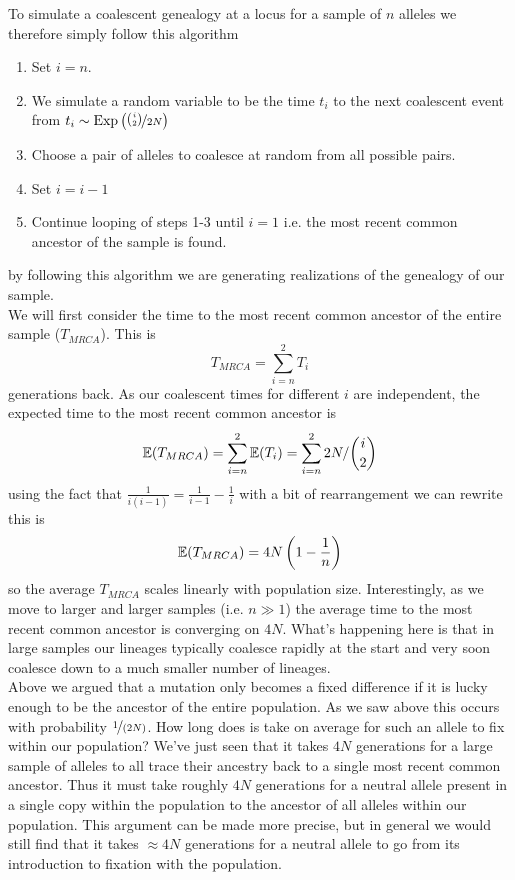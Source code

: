To simulate a coalescent genealogy at a locus for a sample of $n$ alleles we therefore simply follow this
algorithm
\begin{enumerate}
\item Set $i=n$.
\item We simulate a random variable to be the time $t_i$ to the next coalescent event from $t_i \sim
  \text{Exp}\left(\nicefrac{{i \choose
 2}}{2N} \right)$
\item Choose a pair of alleles to coalesce at random from all possible
 pairs.
\item Set $i=i-1$
\item Continue looping of steps 1-3 until $i=1$ i.e. the most recent
 common ancestor of the sample is found.
\end{enumerate}
by following this algorithm we are generating realizations of the
genealogy of our sample. \\

We will first consider the time to the most recent common ancestor of
the entire sample ($T_{MRCA}$). This is
\begin{equation}
T_{MRCA} = \sum_{i=n}^2 T_i
\end{equation}
generations back. As our coalescent times for different $i$ are independent, the expected time to the most recent common ancestor
is
\begin{equation}
\mathbb{E}(T_{MRCA}) = \sum_{i=n}^2 \mathbb{E}(T_i) = \sum_{i=n}^2  2N/{i \choose
 2}
\end{equation}
using the fact that $\frac{1}{i(i-1)}=\frac{1}{i-1} - \frac{1}{i}$ with a bit of
rearrangement we can rewrite this is
\begin{equation}
\mathbb{E}(T_{MRCA}) = 4N\left(1- \frac{1}{n} \right)
\end{equation}
so the average $T_{MRCA}$ scales linearly with population
size. Interestingly, as we move to larger and larger samples (i.e. $n \gg 1$) the average
time to the most recent common ancestor is converging on $4N$. What's
happening here is that in large samples our lineages typically coalesce rapidly
at the start and very soon coalesce down to a much smaller number of
lineages.   \\

Above we argued that a mutation only becomes a fixed difference if it is lucky
enough to be the ancestor of the entire population. As we saw above this occurs
with probability $\nicefrac{1}{(2N)}$. How long does is take on average for
such an allele to fix within our population? We've just seen that it takes $4N$
generations for a large sample of alleles to all trace their ancestry back to a
single most recent common ancestor. Thus it must take roughly $4N$ generations
for a neutral allele present in a single copy within the population to the
ancestor of all alleles within our population. This argument can be made more
precise, but in general we would still find that it takes $\approx 4N$
generations for a neutral allele to go from its introduction to fixation with
the population.   \\


